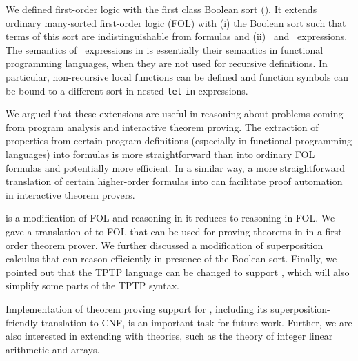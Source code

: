 We defined first-order logic with the first class Boolean sort (\folb{}). It extends ordinary many-sorted first-order logic (FOL) with (i) the Boolean sort such that terms of this sort are indistinguishable from formulas and (ii) \ITE\ and \LETIN\ expressions. The semantics of \LETIN\ expressions in \folb{} is essentially their semantics in functional programming languages, when they are not used for recursive definitions. In particular, non-recursive local functions can be defined and function symbols can be bound to a different sort in nested \verb'let'-\verb'in' expressions.

We argued that these extensions are useful in reasoning about problems coming from program analysis and interactive theorem proving. The extraction of properties from certain program definitions (especially in functional programming languages) into \folb{} formulas is more straightforward than into ordinary FOL formulas and potentially more efficient. In a similar way, a more straightforward translation of certain higher-order formulas into \folb{} can facilitate proof automation in interactive theorem provers.

\folb{} is a modification of FOL and reasoning in it reduces to reasoning in FOL. We gave a translation of \folb{} to FOL that can be used for proving theorems in \folb{} in a first-order theorem prover. We further discussed a modification of superposition calculus that can reason efficiently in presence of the Boolean sort. Finally, we pointed out that the TPTP language can be changed to support \folb{}, which will also simplify some parts of the TPTP syntax.

Implementation of theorem proving support for \folb{}, including its super\-po\-sition-friendly translation to CNF, is an important task for future work. Further, we are also interested in extending \folb{} with theories, such as the theory of integer linear arithmetic and arrays.